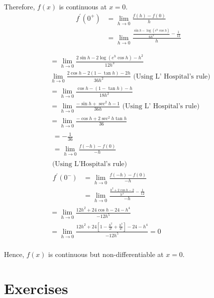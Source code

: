 \begin{enumerate}
\begin{outline}
Therefore, $f(x)$ is continuous at $x=0$.
$$
\begin{aligned}
f^{\prime}\left(0^{+}\right) & =\lim _{h \rightarrow 0} \frac{f(h)-f(0)}{h} \\
& =\lim _{h \rightarrow 0} \frac{\frac{\sin h-\log \left(e^h \cos h\right)}{6 h^2}-\frac{1}{12}}{h}
\end{aligned}
$$


$$
\begin{aligned}
& =\lim _{h \rightarrow 0} \frac{2 \sin h-2 \log \left(e^h \cos h\right)-h^2}{12 h^3} \\
& \lim _{h \rightarrow 0} \frac{2 \cos h-2(1-\tan h)-2 h}{36 h^2} \text { (Using L' Hospital's rule) } \\
& =\lim _{h \rightarrow 0} \frac{\cos h-(1-\tan h)-h}{18 h^2} \\
& =\lim _{h \rightarrow 0} \frac{-\sin h+\sec ^2 h-1}{36 h} \text { (Using L' Hospital's rule) } \\
& =\lim _{h \rightarrow 0} \frac{-\cos h+2 \sec ^2 h \tan h}{36} \\
& \begin{array}{l}
=-\frac{1}{36} \\
=\lim _{h \rightarrow 0} \frac{f(-h)-f(0)}{-h}
\end{array} \\
& \text { (Using L'Hospital's rule) } \\
& \begin{aligned}
f^{\prime}\left(0^{-}\right) & =\lim _{h \rightarrow 0} \frac{f(-h)-f(0)}{-h} \\
& =\lim _{h \rightarrow 0} \frac{\frac{h^2+2 \cos h-2}{h^4}-\frac{1}{12}}{-h}
\end{aligned} \\
& =\lim _{h \rightarrow 0} \frac{12 h^2+24 \cos h-24-h^4}{-12 h^5} \\
& =\lim _{h \rightarrow 0} \frac{12 h^2+24\left[1-\frac{h^2}{2 !}+\frac{h^4}{4 !}\right]-24-h^4}{-12 h^5}=0 \\
&
\end{aligned}
$$

Hence, $f(x)$ is continuous but non-differentiable at $x=0$.
\end{outline}

\end{enumerate}


\section{Exercises}

